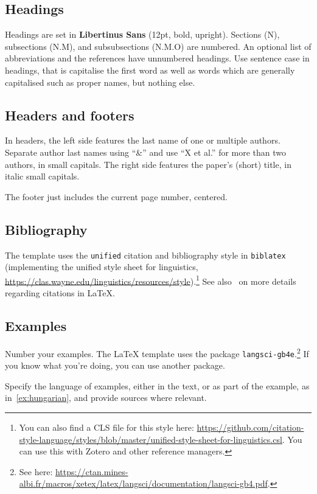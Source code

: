 \subsection{Headings}

Headings are set in \textsf{\textbf{Libertinus Sans}} (12pt, bold, upright).
Sections (N), subsections (N.M), and subsubsections (N.M.O) are numbered. An
optional list of abbreviations and the references have unnumbered headings.
Use sentence case in headings, that is capitalise the first word as well as
words which are generally capitalised such as proper names, but nothing else.

\subsection{Headers and footers}

In headers, the left side features the last name of one or multiple authors.
Separate author last names using \enquote{\&} and use \enquote{X et al.} for
more than two authors, in small capitals. The right side features the paper's
(short) title, in italic small capitals.

The footer just includes the current page number, centered.

\subsection{Bibliography}

The template uses the \texttt{unified} citation and bibliography style in
\texttt{biblatex} (implementing the unified style sheet for linguistics,
\url{https://clas.wayne.edu/linguistics/resources/style}).\footnote{You can also
find a CLS file for this style here:
\url{https://github.com/citation-style-language/styles/blob/master/unified-style-sheet-for-linguistics.csl}.
You can use this with Zotero and other reference managers.} See
also~ on more details regarding citations in \LaTeX.

\subsection{Examples}

Number your examples. The \LaTeX{} template uses the package
\texttt{langsci-gb4e}.\footnote{See here: \url{https://ctan.mines-albi.fr/macros/xetex/latex/langsci/documentation/langsci-gb4.pdf}.} If you know what you're doing, you can use
another package.

Specify the language of examples, either in the text, or as part of the example,
as in~\eqref{ex:hungarian}, and provide sources where relevant.

